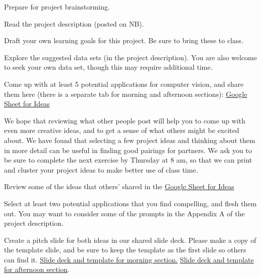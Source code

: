 \documentclass[assignment08_Solutions]{subfiles}
\begin{document}
\begin{exercise}
Prepare for project brainstorming.
\bes
\item Read the project description (posted on NB). 
\item Draft your own learning goals for this project. Be sure to bring these to class.
\item Explore the suggested data sets (in the project description). You are also welcome to seek your own data set, though this may require additional time.
\item Come up with at least 5 potential applications for computer vision, and share them here (there is a separate tab for morning and afternoon sections): \href{https://docs.google.com/spreadsheets/d/1hgZ_9C6l-iiWTn2BPQGgkwHQiP2nL0pPLvAcC5MrIPo/edit?usp=sharing}{Google Sheet for Ideas} 
\ees 
\end{exercise}
 
\vspace{1em}
We hope that reviewing what other people post will help you to come up with even more creative ideas, and to get a sense of what others might be excited about. We have found that selecting a few project ideas and thinking about them in more detail can be useful in finding good pairings for partners. We ask you to be sure to complete the next exercise by Thursday at 8 am, so that we can print and cluster your project ideas to make better use of class time.
\vspace{1em}
\begin{exercise}
\bes
\item Review some of the ideas that others' shared in the \href{https://docs.google.com/spreadsheets/d/1hgZ_9C6l-iiWTn2BPQGgkwHQiP2nL0pPLvAcC5MrIPo/edit?usp=sharing}{Google Sheet for Ideas} 
\item Select at least two potential applications that you find compelling, and flesh them out. You may want to consider some of the prompts in the Appendix A of the project description.
\item Create a pitch slide for both ideas in our shared slide deck. Please make a copy of the template slide, and be sure to keep the template as the first slide so others can find it. \href{https://docs.google.com/presentation/d/1GgH_MhH1vHZ3FLmW3ikaDpZtWpBGUJTzSTuTktX49T8/edit?usp=sharing}{Slide deck and template for morning section.}  \href{https://docs.google.com/presentation/d/1IOXkjZY_5uL_XFaiCjZUL_GDlW7Ux3zv431i9tcxUR0/edit?usp=sharing}{Slide deck and template for afternoon section}.
\ees
\end{exercise}
\end{document}
